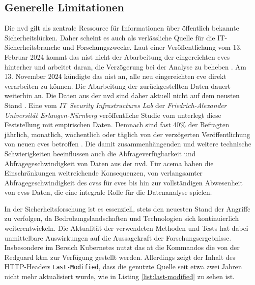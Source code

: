 \subsection{Generelle Limitationen}
\label{limitation-generell}
\par Die \gls{nvd} gilt als zentrale Ressource für Informationen über öffentlich bekannte Sicherheitslücken. Daher scheint es auch als verlässliche Quelle für die IT-Sicherheitsbranche und Forschungszwecke. Laut einer Veröffentlichung vom 13. Februar 2024 kommt das \gls{nist} nicht der Abarbeitung der eingereichten \glspl{cve} hinterher und arbeitet daran, die Verzögerung bei der Analyse zu beheben \autocite{NVDProgramAnnouncement}. Am 13. November 2024 kündigte das \gls{nist} an, alle neu eingereichten \gls{cve} direkt verarbeiten zu können. Die Abarbeitung der zurückgestellten Daten dauert weiterhin an. Die Daten aus der \gls{nvd} sind daher aktuell nicht auf dem neusten Stand \autocite{NationalVulnerabilityDatabase2024}. Eine vom \textit{IT Security Infrastructures Lab} der \textit{Friedrich-Alexander Universität Erlangen-Nürnberg} veröffentliche Studie vom  unterlegt diese Feststellung mit empirischen Daten. Demnach sind fast 40\% der Befragten jährlich, monatlich, wöchentlich oder täglich von der verzögerten Veröffentlichung von neuen \glspl{cve} betroffen \autocite{wunderNVDUsersAttitudes2024}. Die damit zusammenhängenden und weitere technische Schwierigkeiten beeinflussen auch die Abfrageverfügbarkeit und Abfragegeschwindigkeit von Daten aus der \gls{nvd}. Für \gls{acema} haben die Einschränkungen weitreichende Konsequenzen, von verlangsamter Abfragegeschwindigkeit des \gls{cvss} für \glspl{cve} bis hin zur vollständigen Abwesenheit von \gls{cvss} Daten, die eine integrale Rolle für die Datenanalyse spielen.
%
\par In der Sicherheitsforschung ist es essenziell, stets den neuesten Stand der Angriffe zu verfolgen, da Bedrohungslandschaften und Technologien sich kontinuierlich weiterentwickeln. Die Aktualität der verwendeten Methoden und Tests hat dabei unmittelbare Auswirkungen auf die Aussagekraft der Forschungsergebnisse. Insbesondere im Bereich Kubernetes nutzt das \gls{at} die Kommandos die von der Redguard \gls{ktm} zur Verfügung gestellt werden. Allerdings zeigt der Inhalt des HTTP-Headers \verb|Last-Modified|, dass die genutzte Quelle seit etwa zwei Jahren nicht mehr aktualisiert wurde, wie in Listing \ref{list:last-modified} zu sehen ist.


